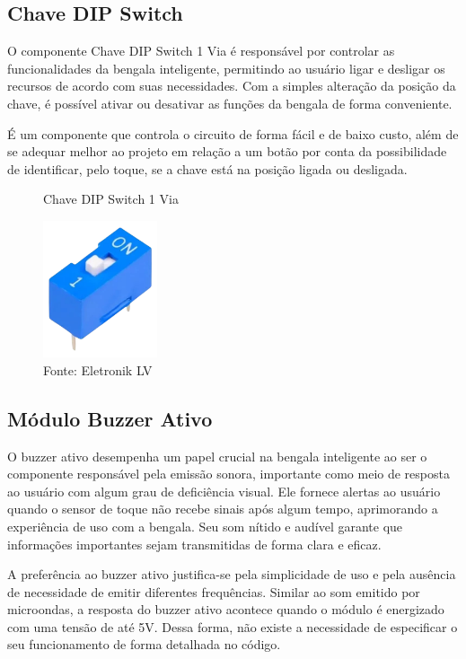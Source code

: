    \subsection{Chave DIP Switch}
    O componente Chave DIP Switch 1 Via é responsável por controlar as funcionalidades da bengala inteligente, permitindo ao usuário ligar e desligar os recursos de acordo com suas necessidades. Com a simples alteração da posição da chave, é possível ativar ou desativar as funções da bengala de forma conveniente.

    É um componente que controla o circuito de forma fácil e de baixo custo, além de se adequar melhor ao projeto em relação a um botão por conta da possibilidade de identificar, pelo toque, se a chave está na posição ligada ou desligada.

    \begin{figure}[h!]
        \captionsetup{width=1\textwidth}
        \caption{\label{fig:chave}Chave DIP Switch 1 Via}
        \centering
        \includegraphics[width=0.3\textwidth]{figuras/chave} 
        \caption*{Fonte: Eletronik LV}
    \end{figure}

    \subsection{Módulo Buzzer Ativo}
    O buzzer ativo desempenha um papel crucial na bengala inteligente ao ser o componente responsável pela emissão sonora, importante como meio de resposta ao usuário com algum grau de deficiência visual. Ele fornece alertas ao usuário quando o sensor de toque não recebe sinais após algum tempo, aprimorando a experiência de uso com a bengala. Seu som nítido e audível garante que informações importantes sejam transmitidas de forma clara e eficaz.

    A preferência ao buzzer ativo justifica-se pela simplicidade de uso e pela ausência de necessidade de emitir diferentes frequências. Similar ao som emitido por microondas, a resposta do buzzer ativo acontece quando o módulo é energizado com uma tensão de até 5V. Dessa forma, não existe a necessidade de especificar o seu funcionamento de forma detalhada no código. 

